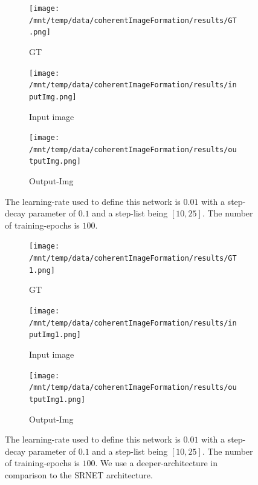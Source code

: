 \documentclass[a4paper, 11pt]{article}
\begin{document}
\begin{figure}[!h]
\centering
\begin{subfigure}[b]{0.22\textwidth}
        \texttt{[image: /mnt/temp/data/coherentImageFormation/results/GT.png]}
        \caption{GT}
        \label{fig:GT}
    \end{subfigure}
    \begin{subfigure}[b]{0.22\textwidth}
        \texttt{[image: /mnt/temp/data/coherentImageFormation/results/inputImg.png]}
        \caption{Input image}
        \label{fig:inputImg}
    \end{subfigure}
    \begin{subfigure}[b]{0.22\textwidth}
        \texttt{[image: /mnt/temp/data/coherentImageFormation/results/outputImg.png]}
        \caption{Output-Img}
        \label{fig:outputImg}
    \end{subfigure}
\caption{The learning-rate used to define this network is $0.01$ with a step-decay parameter of $0.1$ and a step-list being $[10, 25]$. The number of training-epochs is $100$.}
\label{fig:outputFig}
\end{figure}

\begin{figure}[!h]
\centering
\begin{subfigure}[b]{0.22\textwidth}
        \texttt{[image: /mnt/temp/data/coherentImageFormation/results/GT1.png]}
        \caption{GT}
        \label{fig:GT}
    \end{subfigure}
    \begin{subfigure}[b]{0.22\textwidth}
        \texttt{[image: /mnt/temp/data/coherentImageFormation/results/inputImg1.png]}
        \caption{Input image}
        \label{fig:inputImg}
    \end{subfigure}
    \begin{subfigure}[b]{0.22\textwidth}
        \texttt{[image: /mnt/temp/data/coherentImageFormation/results/outputImg1.png]}
        \caption{Output-Img}
        \label{fig:outputImg}
    \end{subfigure}
\caption{The learning-rate used to define this network is $0.01$ with a step-decay parameter of $0.1$ and a step-list being $[10, 25]$. The number of training-epochs is $100$. We use a deeper-architecture in comparison to the SRNET architecture.}
\label{fig:outputFig}
\end{figure}
\end{document}
